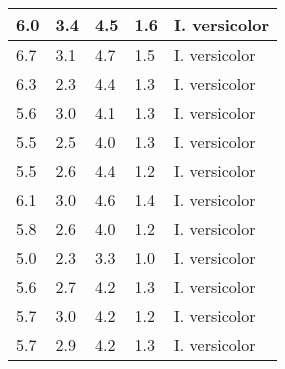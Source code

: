 \begin{appendices}
\begin{center}
\begin{tabular}{|p{2cm}|p{2cm}|p{2cm}|p{2cm}|p{2cm}|}
\hline
6.0	& 3.4 & 4.5	& 1.6 & I. versicolor\\
\hline
6.7	& 3.1 & 4.7	& 1.5 & I. versicolor\\
\hline
6.3	& 2.3 & 4.4	& 1.3 & I. versicolor\\
\hline
5.6	& 3.0 & 4.1	& 1.3 & I. versicolor\\
\hline
5.5	& 2.5 & 4.0	& 1.3 & I. versicolor\\
\hline
5.5	& 2.6 & 4.4	& 1.2 & I. versicolor\\
\hline
6.1	& 3.0 & 4.6	& 1.4 & I. versicolor\\
\hline
5.8	& 2.6 & 4.0	& 1.2 & I. versicolor\\
\hline
5.0	& 2.3 & 3.3	& 1.0 & I. versicolor\\
\hline
5.6	& 2.7 & 4.2	& 1.3 & I. versicolor\\
\hline
5.7	& 3.0 & 4.2	& 1.2 & I. versicolor\\
\hline
5.7	& 2.9 & 4.2	& 1.3 & I. versicolor\\
\hline
\end{tabular}
\end{center}


\end{appendices}

